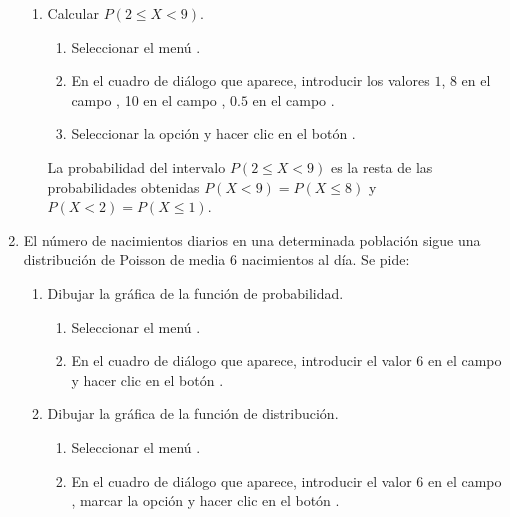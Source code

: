 \begin{enumerate}[leftmargin=*]
\begin{enumerate}
\item Calcular $P(2\leq X < 9)$.
\begin{indicacion}{
\begin{enumerate}
\item Seleccionar el menú .
\item En el cuadro de diálogo que aparece, introducir los valores $1$, $8$ en el campo , 10 en el campo
, $0.5$ en el campo .
\item Seleccionar la opción  y hacer clic en el botón .
\end{enumerate}
La probabilidad del intervalo $P(2\leq X<9)$ es la resta de las probabilidades obtenidas $P(X<9)=P(X\leq 8)$ y $P(X<2)=P(X\leq 1)$.
}
\end{indicacion}
\end{enumerate}


\item El número de nacimientos diarios en una determinada población sigue una distribución de Poisson de media 6
nacimientos al día. Se pide:
\begin{enumerate}
\item Dibujar la gráfica de la función de probabilidad.
\begin{indicacion}{
\begin{enumerate}
\item Seleccionar el menú .
\item En el cuadro de diálogo que aparece, introducir el valor 6 en el campo  y hacer clic en el botón
.
\end{enumerate}}
\end{indicacion}

\item Dibujar la gráfica de la función de distribución.
\begin{indicacion}{
\begin{enumerate}
\item Seleccionar el menú .
\item En el cuadro de diálogo que aparece, introducir el valor 6 en el campo , marcar la opción
 y hacer clic en el botón .
\end{enumerate}}
\end{indicacion}


\end{enumerate}
\end{enumerate}
